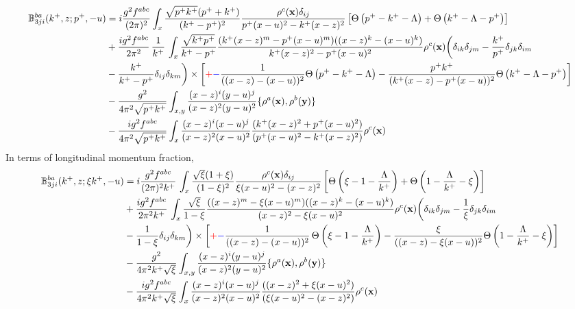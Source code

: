 \documentclass[aps,prd,amsmath,amssymb,nofootinbib]{revtex4-2}
\def\mf#1{\mathbb{#1}}
\def\v#1{\mathbf{#1}}
\numberwithin{equation}{section}
\begin{document}
\begin{align}
   \mf{B}^{ba}_{3ji}(k^+, z;p^+, -u) & = i \frac{g^2 f^{abc}}{(2\pi)^{2}} \int_{x} %
   \frac{\sqrt{p^{+}k^{+}}(p^{+}+k^{+})} {(k^{+}-p^{+})^2} \frac{\rho^c(\v{x}) \delta_{ij}}{p^{+}(x-u)^{2} - k^{+}(x-z)^{2} }\left[\Theta\left(p^{+} - k^{+} - \Lambda \right)+\Theta\left(k^{+}-\Lambda-p^{+}\right)\right]  \notag \\ & + \frac{ig^2 f^{abc}} {2\pi^{2} } \,\frac{1}{k^{+}}\, 
   \int_{x}  
   \frac{\sqrt{k^{+}p^{+}}}{k^{+}-p^{+}} 
   \frac{(k^{+}(x-z)^{m} - p^{+} (x-u)^m)((x-z)^{k} -  (x-u)^{k})} {k^{+}(x-z)^{2} - p^{+} (x-u)^2}
   \rho^c(\v{x}) \bigg( 
  \delta_{ik} \delta_{jm}
  - \frac{k^{+}}{p^{+}}\delta_{jk} \delta_{im}
 \notag \\ &  - \frac{k^{+}}{k^{+}-p^{+}}\delta_{ij} \delta_{km}
   \bigg)\times\left[\textcolor{red}{+}\textcolor{blue}{-}\frac{1}{((x-z) -  (x-u))^2}\Theta\left(p^{+} - k^{+} - \Lambda \right)-\frac{p^{+}k^{+}}{(k^{+}(x-z) -  p^{+} (x-u))^2} \Theta\left(k^{+}-\Lambda-p^{+}\right)\right]\notag \\ & -\frac{g^{2}}{4\pi^{2} \sqrt{p^{+}k^{+}}}\int_{x,y}\frac{(x-z)^{i} (y-u)^{j}}{(x-z)^{ 2}(y-u)^{2}}\{\rho^{a}(\v{x}),\rho^{b}(\v{y})\} \notag \\ &  -\frac{ig^{2}f^{abc}}{4\pi^{2} \sqrt{p^{+}k^{+}}} \int_{x}\frac{(x-z)^{i}(x-u)^{j}}{(x-z)^{2}(x-u)^{2}}\frac{(k^{+}(x-z)^{2} +p^{+} (x-u)^{2})}{(p^{+} (x-u)^{2}-k^{+}(x-z)^{2})}\rho^{c}(\v{x})
\end{align}
In terms of longitudinal momentum fraction,
\begin{align}
   \mf{B}^{ba}_{3ji}(k^+, z;\xi k^+, -u) & = i \frac{g^2 f^{abc}}{(2\pi)^{2} k^{+}}\,\int_{x}
   \frac{\sqrt{\xi} (1+\xi) } {(1-\xi)^2} \frac{\rho^c(\v{x}) \delta_{ij}}{\xi (x-u)^{2} - (x-z)^{2} }\left[\Theta\left(\xi - 1 - \frac{\Lambda}{k^{+}}\right)+\Theta\left(1-\frac{\Lambda}{k^{+}}-\xi\right)\right]  \notag \\ & + \frac{ig^2 f^{abc}} {2\pi^{2} k^{+}}\,  
   \int_{x}  
   \frac{\sqrt{\xi}}{1-\xi} 
   \frac{((x-z)^{m} - \xi (x-u)^m)((x-z)^{k} -  (x-u)^{k})} {(x-z)^{2} - \xi (x-u)^2}
   \rho^c(\v{x}) \bigg( 
  \delta_{ik} \delta_{jm}
  - \frac{1}{\xi}\delta_{jk} \delta_{im}
 \notag \\ &  - \frac{1}{1-\xi}\delta_{ij} \delta_{km}
   \bigg)\times  \left[\textcolor{red}{+}\textcolor{blue}{-}\frac{1}{((x-z) -  (x-u))^2}\,\Theta\left(\xi - 1 - \frac{\Lambda}{k^{+}}\right)-\frac{\xi}{((x-z) -  \xi (x-u))^2} \Theta\left(1-\frac{\Lambda}{k^{+}}-\xi\right)\right]\notag \\ & -\frac{g^{2}}{4\pi^{2} k^{+}\sqrt{\xi}}\int_{x,y}\frac{(x-z)^{i} (y-u)^{j}}{(x-z)^{ 2}(y-u)^{2}}\{\rho^{a}(\v{x}),\rho^{b}(\v{y})\} \notag \\ &  -\frac{ig^{2}f^{abc}}{4\pi^{2} k^{+}\sqrt{\xi}} \int_{x}\frac{(x-z)^{i}(x-u)^{j}}{(x-z)^{2}(x-u)^{2}}\frac{((x-z)^{2} +\xi (x-u)^{2})}{(\xi (x-u)^{2}-(x-z)^{2})}\rho^{c}(\v{x})
\end{align}
\end{document}
